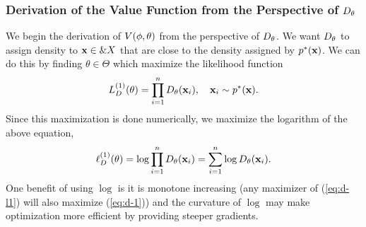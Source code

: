 \subsubsection{Derivation of the Value Function from the Perspective of $D_\theta$}
\label{sec:derivation-d}

We begin the derivation of $V(\phi, \theta)$ from the perspective of $D_\theta$. We want
$D_\theta$ to assign density to $\mathbf{x} \in \&X$ that are close to the
density assigned by $p^*(\mathbf{x})$. We can do this by finding
$\theta \in \Theta$ which maximize the likelihood function
\begin{align}
  \label{eq:d-1}
  L_{D}^{(1)}(\theta) = \prod_{i=1}^n D_\theta(\mathbf{x}_i), \quad \mathbf{x}_i \sim p^*(\mathbf{x}).
\end{align}
Since this maximization is done numerically, we maximize the logarithm
of the above equation,
\begin{align}
  \label{eq:d-l1}
  \ell_{D}^{(1)}(\theta) = \log \prod_{i=1}^n D_\theta(\mathbf{x}_i) = \sum_{i=1}^n \log D_\theta (\mathbf{x}_i).
\end{align}
One benefit of using $\log$ is it is monotone increasing (any
maximizer of (\ref{eq:d-l1}) will also maximize (\ref{eq:d-1})) and
the curvature of $\log$ may make optimization more efficient by
providing steeper gradients.

